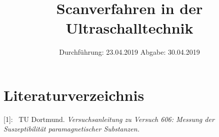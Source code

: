 

\subject{Nr. US2}
\title{Scanverfahren in der Ultraschalltechnik}
\date{%
  Durchführung: 23.04.2019
  \hspace{3em}
  Abgabe: 30.04.2019
}



\maketitle
\thispagestyle{empty}
\tableofcontents
\newpage






\section{Literaturverzeichnis}

[1]: \ TU Dortmund. \textit{Versuchsanleitung zu Versuch 606:
Messung der Suszeptibilität paramagnetischer Substanzen.}\newline

\printbibliography{}


